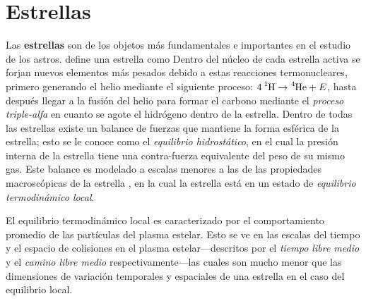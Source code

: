 \section{Estrellas}

Las \textbf{estrellas} son de los objetos más fundamentales e importantes en el
estudio de los astros. \citet*{anIntroStellarAstro::chapter1_basicConcepts}
define una estrella como  Dentro del núcleo de cada estrella activa se forjan nuevos elementos
más pesados debido a estas reacciones termonucleares, primero generando el helio
mediante el siguiente proceso: $\ce{4 ^1H} \rightarrow \ce{^4He} + E$, hasta
después llegar a la fusión del helio para formar el carbono mediante el
\textit{proceso triple-alfa} en cuanto se agote el hidrógeno dentro de la
estrella. Dentro de todas las estrellas existe un balance de fuerzas que
mantiene la forma esférica de la estrella; esto se le conoce como el
\textit{equilibrio hidrostático}, en el cual la presión interna de la estrella
tiene una contra-fuerza equivalente del peso de su mismo gas. Este balance es
modelado a escalas menores a las de las propiedades macroscópicas de la estrella
\citet{anIntroTheoryStellarStructureEvolution::chapter2_eqsStellarEvolution}, en
la cual la estrella está en un estado de \textit{equilibrio termodinámico
local}. 

El equilibrio termodinámico local es caracterizado por el comportamiento
promedio de las partículas del plasma estelar. Esto se ve en las escalas del
tiempo y el espacio de colisiones en el plasma estelar---descritos por el
\textit{tiempo libre medio} y el \textit{camino libre medio}
respectivamente---las cuales son mucho menor que las dimensiones de variación
temporales y espaciales de una estrella en el caso del equilibrio local.


